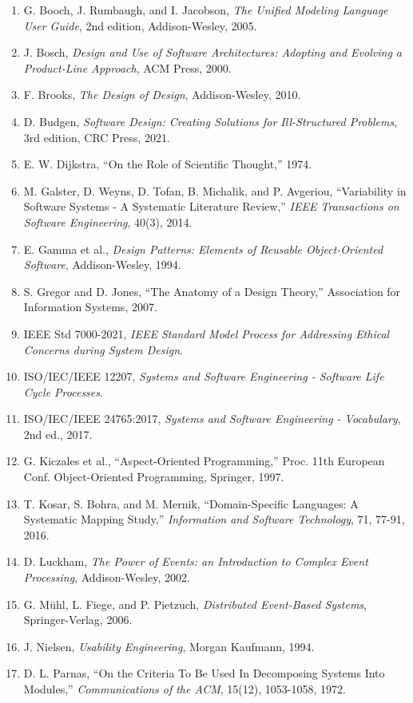 \documentclass[a4paper,11pt]{ltjsarticle}
\numberwithin{figure}{section}
\numberwithin{table}{section}
\begin{document}
\begin{enumerate}
  \item G. Booch, J. Rumbaugh, and I. Jacobson, \textit{The Unified Modeling Language User Guide}, 2nd edition, Addison-Wesley, 2005.
  \item J. Bosch, \textit{Design and Use of Software Architectures: Adopting and Evolving a Product-Line Approach}, ACM Press, 2000.
  \item F. Brooks, \textit{The Design of Design}, Addison-Wesley, 2010.
  \item D. Budgen, \textit{Software Design: Creating Solutions for Ill-Structured Problems}, 3rd edition, CRC Press, 2021.
  \item E. W. Dijkstra, “On the Role of Scientific Thought,” 1974.
  \item M. Galster, D. Weyns, D. Tofan, B. Michalik, and P. Avgeriou, “Variability in Software Systems - A Systematic Literature Review,” \textit{IEEE Transactions on Software Engineering}, 40(3), 2014.
  \item E. Gamma et al., \textit{Design Patterns: Elements of Reusable Object-Oriented Software}, Addison-Wesley, 1994.
  \item S. Gregor and D. Jones, “The Anatomy of a Design Theory,” Association for Information Systems, 2007.
  \item IEEE Std 7000-2021, \textit{IEEE Standard Model Process for Addressing Ethical Concerns during System Design}.
  \item ISO/IEC/IEEE 12207, \textit{Systems and Software Engineering - Software Life Cycle Processes}.
  \item ISO/IEC/IEEE 24765:2017, \textit{Systems and Software Engineering - Vocabulary}, 2nd ed., 2017.
  \item G. Kiczales et al., “Aspect-Oriented Programming,” Proc. 11th European Conf. Object-Oriented Programming, Springer, 1997.
  \item T. Kosar, S. Bohra, and M. Mernik, “Domain-Specific Languages: A Systematic Mapping Study,” \textit{Information and Software Technology}, 71, 77-91, 2016.
  \item D. Luckham, \textit{The Power of Events: an Introduction to Complex Event Processing}, Addison-Wesley, 2002.
  \item G. Mühl, L. Fiege, and P. Pietzuch, \textit{Distributed Event-Based Systems}, Springer-Verlag, 2006.
  \item J. Nielsen, \textit{Usability Engineering}, Morgan Kaufmann, 1994.
  \item D. L. Parnas, “On the Criteria To Be Used In Decomposing Systems Into Modules,” \textit{Communications of the ACM}, 15(12), 1053-1058, 1972.

\end{enumerate}
\end{document}
